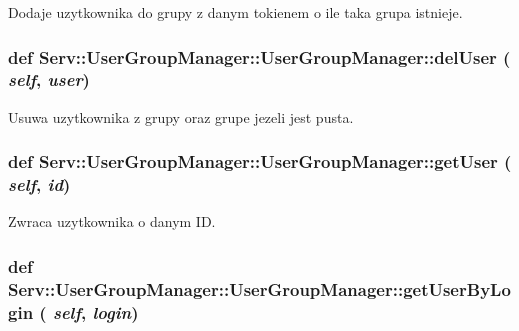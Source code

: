 \label{class_serv_1_1_user_group_manager_1_1_user_group_manager_a46ee225566738a93c7c036b464a931fb}
\begin{DoxyVerb}Dodaje uzytkownika do grupy z danym tokienem o ile taka grupa istnieje.\end{DoxyVerb}
 \hypertarget{class_serv_1_1_user_group_manager_1_1_user_group_manager_a4b747272c8166d17b9458b3f8c4796f0}{
\subsubsection[{delUser}]{\setlength{\rightskip}{0pt plus 5cm}def Serv::UserGroupManager::UserGroupManager::delUser ( {\em self}, \/   {\em user})}}
\label{class_serv_1_1_user_group_manager_1_1_user_group_manager_a4b747272c8166d17b9458b3f8c4796f0}
\begin{DoxyVerb}Usuwa uzytkownika z grupy oraz grupe jezeli jest pusta.\end{DoxyVerb}
 \hypertarget{class_serv_1_1_user_group_manager_1_1_user_group_manager_a94bccb5702d504f5b782ba2379aaaab4}{
\subsubsection[{getUser}]{\setlength{\rightskip}{0pt plus 5cm}def Serv::UserGroupManager::UserGroupManager::getUser ( {\em self}, \/   {\em id})}}
\label{class_serv_1_1_user_group_manager_1_1_user_group_manager_a94bccb5702d504f5b782ba2379aaaab4}
\begin{DoxyVerb}Zwraca uzytkownika o danym ID.\end{DoxyVerb}
 \hypertarget{class_serv_1_1_user_group_manager_1_1_user_group_manager_aed20d08470748f78a641e6cc5700b505}{
\subsubsection[{getUserByLogin}]{\setlength{\rightskip}{0pt plus 5cm}def Serv::UserGroupManager::UserGroupManager::getUserByLogin ( {\em self}, \/   {\em login})}}
